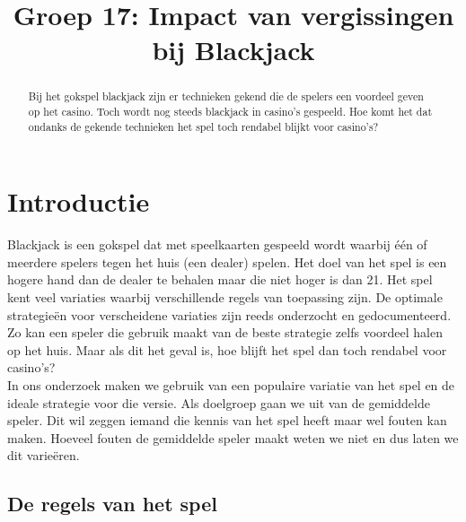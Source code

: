\documentclass[conference]{IEEEtran}
\begin{document}
\title{Groep 17: Impact van vergissingen bij Blackjack}

\author{
\and
{}
\and
{}
}

\maketitle


\begin{abstract}
Bij het gokspel blackjack zijn er technieken gekend die de spelers een voordeel geven op het casino. Toch wordt nog steeds blackjack in casino's gespeeld. Hoe komt het dat ondanks de gekende technieken het spel toch rendabel blijkt voor casino's?
\end{abstract}

\IEEEpeerreviewmaketitle

\section{Introductie}
Blackjack is een gokspel dat met speelkaarten gespeeld wordt waarbij \'e\'en of meerdere spelers tegen het huis (een dealer) spelen. Het doel van het spel is een hogere hand dan de dealer te behalen maar die niet hoger is dan 21. Het spel kent veel variaties waarbij verschillende regels van toepassing zijn. De optimale strategie\"en voor verscheidene variaties zijn reeds onderzocht en gedocumenteerd. Zo kan een speler die gebruik maakt van de beste strategie zelfs voordeel halen op het huis. Maar als dit het geval is, hoe blijft het spel dan toch rendabel voor casino's?
\\In ons onderzoek maken we gebruik van een populaire variatie van het spel en de ideale strategie voor die versie. Als doelgroep gaan we uit van de gemiddelde speler. Dit wil zeggen iemand die kennis van het spel heeft maar wel fouten kan maken. Hoeveel fouten de gemiddelde speler maakt weten we niet en dus laten we dit varie\"eren.

\subsection{De regels van het spel}
\end{document}
